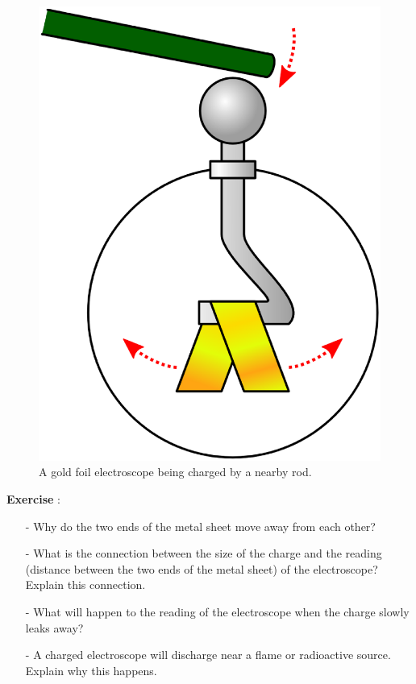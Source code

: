 \documentclass[12pt,a4paper]{article}
\numberwithin{equation}{section}
\numberwithin{figure}{section}
\newcounter{Exercise}
\numberwithin{table}{section}
\begin{document}
\begin{figure}\begin{center}
\includegraphics[scale=0.2]{Electroscope.eps}
\caption{A gold foil electroscope being charged by a nearby rod.\protect\footnotemark}\label{fig:electroscope}
\end{center}\end{figure}

\begin{shaded}
\textbf{Exercise \theExercise {}} :
\begin{itemize}
\item[-] Why do the two ends of the metal sheet move away from each other?
\item[-] What is the connection between the size of the charge and the reading (distance between the two ends of the metal sheet) of the electroscope? Explain this connection.
\item[-] What will happen to the reading of the electroscope when the charge slowly leaks away?
\item[-] A charged electroscope will discharge near a flame or radioactive source. Explain why this happens.
\end{itemize}\end{shaded}
\end{document}
